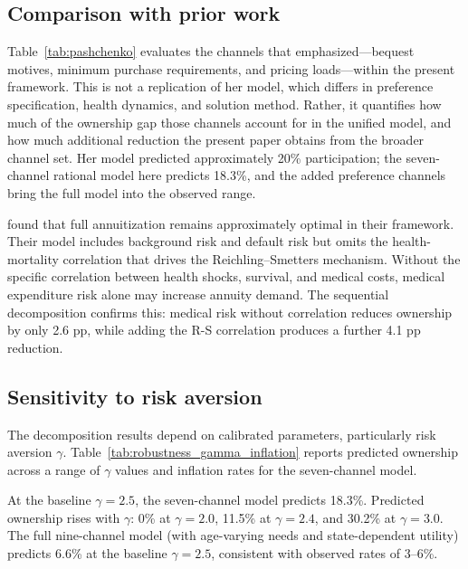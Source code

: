 \documentclass[12pt]{article}
\begin{document}
\subsection{Comparison with prior work}

Table~\ref{tab:pashchenko} evaluates the channels that \citet{pashchenko2013} emphasized---bequest motives, minimum purchase requirements, and pricing loads---within the present framework. This is not a replication of her model, which differs in preference specification, health dynamics, and solution method. Rather, it quantifies how much of the ownership gap those channels account for in the unified model, and how much additional reduction the present paper obtains from the broader channel set. Her model predicted approximately 20\% participation; the seven-channel rational model here predicts 18.3\%, and the added preference channels bring the full model into the observed range.



\citet{peijnenburg2016} found that full annuitization remains approximately optimal in their framework. Their model includes background risk and default risk but omits the health-mortality correlation that drives the Reichling--Smetters mechanism. Without the specific correlation between health shocks, survival, and medical costs, medical expenditure risk alone may increase annuity demand. The sequential decomposition confirms this: medical risk without correlation reduces ownership by only 2.6 pp, while adding the R-S correlation produces a further 4.1 pp reduction.

\subsection{Sensitivity to risk aversion}
\label{sec:monte_carlo}

The decomposition results depend on calibrated parameters, particularly risk aversion $\gamma$. Table~\ref{tab:robustness_gamma_inflation} reports predicted ownership across a range of $\gamma$ values and inflation rates for the seven-channel model.



At the baseline $\gamma = 2.5$, the seven-channel model predicts 18.3\%. Predicted ownership rises with $\gamma$: 0\% at $\gamma = 2.0$, 11.5\% at $\gamma = 2.4$, and 30.2\% at $\gamma = 3.0$. The full nine-channel model (with age-varying needs and state-dependent utility) predicts 6.6\% at the baseline $\gamma = 2.5$, consistent with observed rates of 3--6\%.
\end{document}

